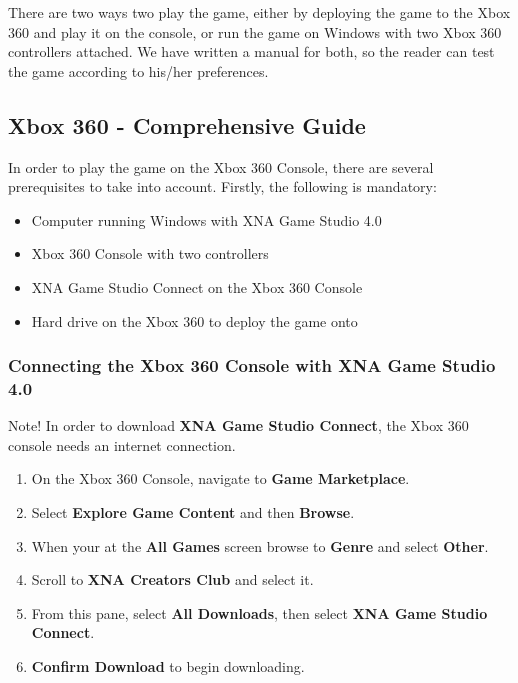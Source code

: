 There are two ways two play the game, either by deploying the game to the Xbox 360 and play it on the console, or 
run the game on Windows with two Xbox 360 controllers attached. We have written a manual for both, so the reader can 
test the game according to his/her preferences. 

\subsection{Xbox 360 - Comprehensive Guide}

In order to play the game on the Xbox 360 Console, there are several prerequisites to take into account. Firstly, 
the following is mandatory\cite{deploy}:

\begin{itemize}
	\item Computer running Windows with XNA Game Studio 4.0 
	\item Xbox 360 Console with two controllers
	\item XNA Game Studio Connect on the Xbox 360 Console 
	\item Hard drive on the Xbox 360 to deploy the game onto 
\end{itemize}

\subsubsection{Connecting the Xbox 360 Console with XNA Game Studio 4.0}

Note! In order to download \textbf{XNA Game Studio Connect}, the Xbox 360 console needs an internet connection. \\

\begin{enumerate}
	\item On the Xbox 360 Console, navigate to \textbf{Game Marketplace}.
	\item Select \textbf{Explore Game Content} and then \textbf{Browse}. 
	\item When your at the \textbf{All Games} screen browse to \textbf{Genre} and select \textbf{Other}. 
	\item Scroll to \textbf{XNA Creators Club} and select it. 
	\item From this pane, select \textbf{All Downloads}, then select \textbf{XNA Game Studio Connect}. 
	\item \textbf{Confirm Download} to begin downloading. 
\end{enumerate}

